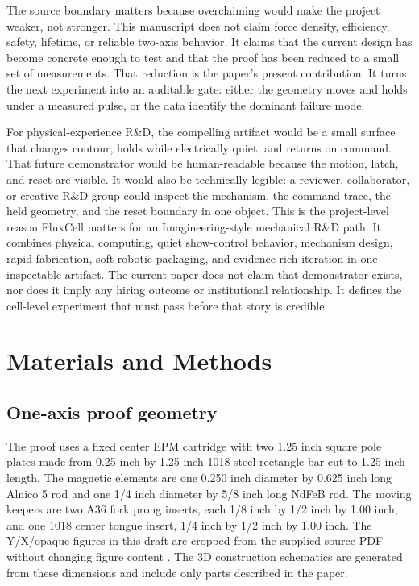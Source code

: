 \documentclass[12pt,letterpaper]{article}
\newcommand{\fluxcell}{FluxCell}
\begin{document}
The source boundary matters because overclaiming would make the project weaker, not stronger. This manuscript does not claim force density, efficiency, safety, lifetime, or reliable two-axis behavior. It claims that the current design has become concrete enough to test and that the proof has been reduced to a small set of measurements. That reduction is the paper's present contribution. It turns the next experiment into an auditable gate: either the geometry moves and holds under a measured pulse, or the data identify the dominant failure mode.

For physical-experience R\&D, the compelling artifact would be a small surface that changes contour, holds while electrically quiet, and returns on command. That future demonstrator would be human-readable because the motion, latch, and reset are visible. It would also be technically legible: a reviewer, collaborator, or creative R\&D group could inspect the mechanism, the command trace, the held geometry, and the reset boundary in one object. This is the project-level reason \fluxcell{} matters for an Imagineering-style mechanical R\&D path. It combines physical computing, quiet show-control behavior, mechanism design, rapid fabrication, soft-robotic packaging, and evidence-rich iteration in one inspectable artifact. The current paper does not claim that demonstrator exists, nor does it imply any hiring outcome or institutional relationship. It defines the cell-level experiment that must pass before that story is credible.

\section{Materials and Methods}

\subsection{One-axis proof geometry}

The proof uses a fixed center EPM cartridge with two 1.25 inch square pole plates made from 0.25 inch by 1.25 inch 1018 steel rectangle bar cut to 1.25 inch length. The magnetic elements are one 0.250 inch diameter by 0.625 inch long Alnico 5 rod and one 1/4 inch diameter by 5/8 inch long NdFeB rod. The moving keepers are two A36 fork prong inserts, each 1/8 inch by 1/2 inch by 1.00 inch, and one 1018 center tongue insert, 1/4 inch by 1/2 inch by 1.00 inch. The Y/X/opaque figures in this draft are cropped from the supplied source PDF without changing figure content \cite{fluxcellGeometry2026}. The 3D construction schematics are generated from these dimensions and include only parts described in the paper.
\end{document}
